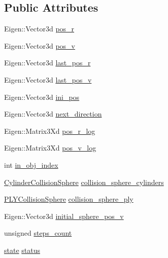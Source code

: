 \subsection*{Public Attributes}
\begin{DoxyCompactItemize}
\item 
Eigen\+::\+Vector3d \hyperlink{class_walker_a1008a95833c1f74b53f02e57e84417b7}{pos\+\_\+r}
\item 
Eigen\+::\+Vector3d \hyperlink{class_walker_a2c1bf5a8da9e8f3a230a22ab4ae0e373}{pos\+\_\+v}
\item 
Eigen\+::\+Vector3d \hyperlink{class_walker_a8c78216899e04e9439a991cbad9df36f}{last\+\_\+pos\+\_\+r}
\item 
Eigen\+::\+Vector3d \hyperlink{class_walker_a2d50601346a754183b38890c18e7a6e7}{last\+\_\+pos\+\_\+v}
\item 
Eigen\+::\+Vector3d \hyperlink{class_walker_a98116f0e5d65e1cf65449d80a2d87617}{ini\+\_\+pos}
\item 
Eigen\+::\+Vector3d \hyperlink{class_walker_ad1629485a13c80367a563ed7b88149eb}{next\+\_\+direction}
\item 
Eigen\+::\+Matrix3\+Xd \hyperlink{class_walker_a1ba5a46fddf62eb3eeaabc7c868afe07}{pos\+\_\+r\+\_\+log}
\item 
Eigen\+::\+Matrix3\+Xd \hyperlink{class_walker_a62d99cc92226681123be94e64fb2bf7b}{pos\+\_\+v\+\_\+log}
\item 
int \hyperlink{class_walker_adf221f7a635c09cfaafc0dab5aa38106}{in\+\_\+obj\+\_\+index}
\item 
\hyperlink{class_cylinder_collision_sphere}{Cylinder\+Collision\+Sphere} \hyperlink{class_walker_a28d139085430c9a11e0a70be2c3083af}{collision\+\_\+sphere\+\_\+cylinders}
\item 
\hyperlink{class_p_l_y_collision_sphere}{P\+L\+Y\+Collision\+Sphere} \hyperlink{class_walker_a8aecfb76c9007eb6da99b024bc5e425d}{collision\+\_\+sphere\+\_\+ply}
\item 
Eigen\+::\+Vector3d \hyperlink{class_walker_a8a27ead68d3dc7140afbec2710fb3176}{initial\+\_\+sphere\+\_\+pos\+\_\+v}
\item 
unsigned \hyperlink{class_walker_a83536011f160b42f6c39f121ee550731}{steps\+\_\+count}
\item 
\hyperlink{class_walker_afcad3f5c11d0bd045de22fb0347dc44c}{state} \hyperlink{class_walker_afa37629b74387435a0bb02e0c061a718}{status}
\item 
\mbox{\label{class_walker_aa80fe894bc14568bdc296083ca5e5492}} 

\end{DoxyCompactItemize}
